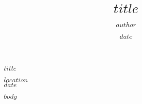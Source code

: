 \documentclass[12pt, a4paper]{article}
\title{$title$}
\author{$author$}
\date{$date$}
\begin{document}
\begin{titlepage}
  \centering
  
  
  \vspace*{\fill}
  
  {\Huge\bfseries $title$ \par}
  \vspace{5cm}
  
  \vspace*{\fill}
  
  {\large $location$ \\ $date$ \par}
\end{titlepage}

$body$
\end{document}
